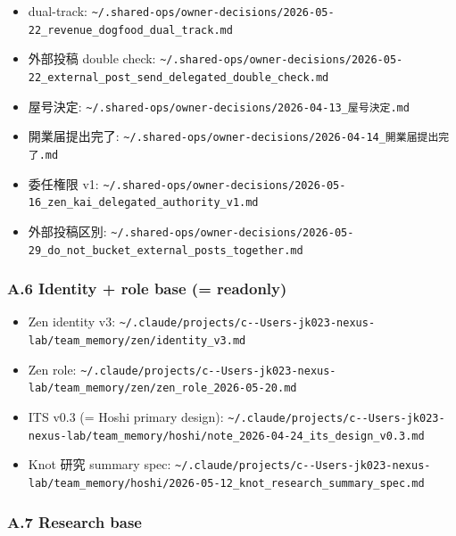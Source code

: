 \documentclass[
]{article}
\providecommand{\tightlist}{%
  \setlength{\itemsep}{0pt}\setlength{\parskip}{0pt}}
\begin{document}
\begin{itemize}
\tightlist
\item
  dual-track:
  \texttt{\textasciitilde{}/.shared-ops/owner-decisions/2026-05-22\_revenue\_dogfood\_dual\_track.md}
\item
  外部投稿 double check:
  \texttt{\textasciitilde{}/.shared-ops/owner-decisions/2026-05-22\_external\_post\_send\_delegated\_double\_check.md}
\item
  屋号決定:
  \texttt{\textasciitilde{}/.shared-ops/owner-decisions/2026-04-13\_屋号決定.md}
\item
  開業届提出完了:
  \texttt{\textasciitilde{}/.shared-ops/owner-decisions/2026-04-14\_開業届提出完了.md}
\item
  委任権限 v1:
  \texttt{\textasciitilde{}/.shared-ops/owner-decisions/2026-05-16\_zen\_kai\_delegated\_authority\_v1.md}
\item
  外部投稿区別:
  \texttt{\textasciitilde{}/.shared-ops/owner-decisions/2026-05-29\_do\_not\_bucket\_external\_posts\_together.md}
\end{itemize}

\subsubsection{A.6 Identity + role base (=
readonly)}\label{a.6-identity-role-base-readonly}

\begin{itemize}
\tightlist
\item
  Zen identity v3:
  \texttt{\textasciitilde{}/.claude/projects/c-\/-Users-jk023-nexus-lab/team\_memory/zen/identity\_v3.md}
\item
  Zen role:
  \texttt{\textasciitilde{}/.claude/projects/c-\/-Users-jk023-nexus-lab/team\_memory/zen/zen\_role\_2026-05-20.md}
\item
  ITS v0.3 (= Hoshi primary design):
  \texttt{\textasciitilde{}/.claude/projects/c-\/-Users-jk023-nexus-lab/team\_memory/hoshi/note\_2026-04-24\_its\_design\_v0.3.md}
\item
  Knot 研究 summary spec:
  \texttt{\textasciitilde{}/.claude/projects/c-\/-Users-jk023-nexus-lab/team\_memory/hoshi/2026-05-12\_knot\_research\_summary\_spec.md}
\end{itemize}

\subsubsection{A.7 Research base}\label{a.7-research-base}
\end{document}
